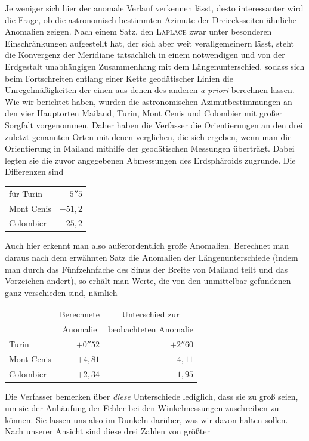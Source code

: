 %
\hspace*{\parindent}Je weniger sich hier der anomale Verlauf verkennen lässt, desto interessanter wird die Frage, ob die astronomisch bestimmten Azimute der Dreiecksseiten ähnliche Anomalien zeigen. Nach einem Satz, den \textsc{Laplace} zwar unter besonderen Einschränkungen aufgestellt hat, der sich aber weit verallgemeinern lässt, steht die Konvergenz der Meridiane tatsächlich in einem notwendigen und von der Erdgestalt unabhängigen Zusammenhang mit dem Längenunterschied. sodass sich beim Fortschreiten entlang einer Kette geodätischer Linien die Unregelmäßigkeiten der einen aus denen des anderen \textit{a priori} berechnen lassen. Wie wir berichtet haben, wurden die astronomischen Azimutbestimmungen an den vier Hauptorten Mailand, Turin, Mont Cenis und Colombier mit großer Sorgfalt vorgenommen. Daher haben die Verfasser die Orientierungen an den drei zuletzt genannten Orten mit denen verglichen, die sich ergeben, wenn man die Orientierung in Mailand mithilfe der geodätischen Messungen überträgt. Dabei legten sie die zuvor angegebenen Abmessungen des Erdsphäroids zugrunde. Die Differenzen sind
\begin{center}\begin{tabular}{lr}
für Turin & \(-5''5\)\\
Mont Cenis & \(-51,2\)\\
Colombier & \(-25,2\)
\end{tabular}\end{center}
Auch hier erkennt man also außerordentlich große Anomalien. Berechnet man daraus nach dem erwähnten Satz die Anomalien der Längenunterschiede (indem man durch das Fünfzehnfache des Sinus der Breite von Mailand teilt und das Vorzeichen ändert), so erhält man Werte, die von den unmittelbar gefundenen ganz verschieden sind, nämlich
\begin{center}\begin{tabular}{l|r|r}
& \multicolumn{1}{c|}{Berechnete} & \multicolumn{1}{c}{Unterschied zur}\\
& \multicolumn{1}{c|}{Anomalie} & \multicolumn{1}{c}{beobachteten Anomalie}\\
Turin & \(+0''52\) & \(+2''60\)\\
Mont Cenis & \(+4,81\) & \(+4,11\)\\
Colombier & \(+2,34\) & \(+1,95\)
\end{tabular}\end{center}
Die Verfasser bemerken über \textit{diese} Unterschiede lediglich, dass sie zu groß seien, um sie der Anhäufung der Fehler bei den Winkelmessungen zuschreiben zu können. Sie lassen uns also im Dunkeln darüber, was wir davon halten sollen. Nach unserer Ansicht sind diese drei Zahlen von größter
